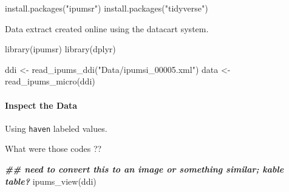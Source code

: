 \documentclass[
]{book}
\newenvironment{Shaded}{\begin{snugshade}}{\end{snugshade}}
\newcommand{\DecValTok}[1]{\textcolor[rgb]{0.00,0.00,0.81}{#1}}
\newcommand{\DocumentationTok}[1]{\textcolor[rgb]{0.56,0.35,0.01}{\textbf{\textit{#1}}}}
\newcommand{\FunctionTok}[1]{\textcolor[rgb]{0.00,0.00,0.00}{#1}}
\newcommand{\NormalTok}[1]{#1}
\newcommand{\OtherTok}[1]{\textcolor[rgb]{0.56,0.35,0.01}{#1}}
\newcommand{\SpecialCharTok}[1]{\textcolor[rgb]{0.00,0.00,0.00}{#1}}
\newcommand{\StringTok}[1]{\textcolor[rgb]{0.31,0.60,0.02}{#1}}
\begin{document}
\begin{Shaded}
\begin{Highlighting}[]
\FunctionTok{install.packages}\NormalTok{(}\StringTok{"ipumsr"}\NormalTok{)}
\FunctionTok{install.packages}\NormalTok{(}\StringTok{"tidyverse"}\NormalTok{)}
\end{Highlighting}
\end{Shaded}

Data extract created online using the datacart system.

\begin{Shaded}
\begin{Highlighting}[]
\FunctionTok{library}\NormalTok{(ipumsr)}
\FunctionTok{library}\NormalTok{(dplyr)}


\NormalTok{ddi }\OtherTok{\textless{}{-}} \FunctionTok{read\_ipums\_ddi}\NormalTok{(}\StringTok{"Data/ipumsi\_00005.xml"}\NormalTok{)}
\NormalTok{data }\OtherTok{\textless{}{-}} \FunctionTok{read\_ipums\_micro}\NormalTok{(ddi)}
\end{Highlighting}
\end{Shaded}

\hypertarget{inspect-the-data}{%
\paragraph{Inspect the Data}\label{inspect-the-data}}

Using \texttt{haven} labeled values.

\begin{Shaded}
\end{Shaded}

What were those codes ??

\begin{Shaded}
\begin{Highlighting}[]
\DocumentationTok{\#\# need to convert this to an image or something similar; kable table?}
\FunctionTok{ipums\_view}\NormalTok{(ddi)}
\end{Highlighting}
\end{Shaded}
\end{document}
